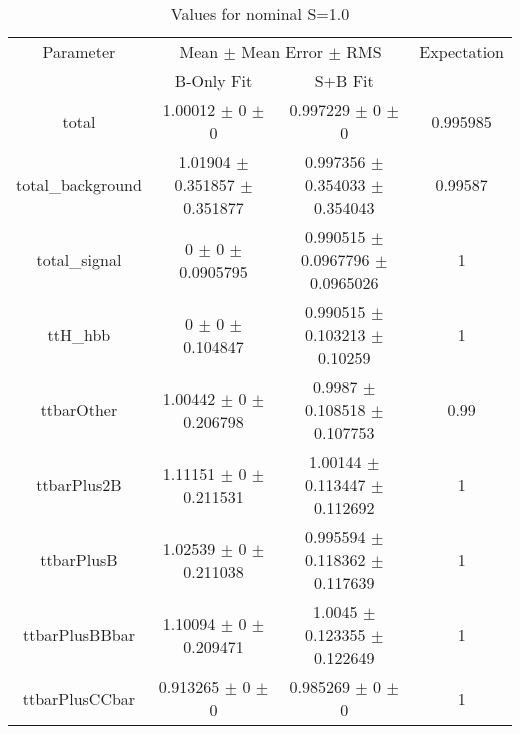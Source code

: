 \begin{table}
\centering
\caption{Values for nominal S=1.0}
\begin{tabular}{cccc}
\toprule
Parameter & \multicolumn{2}{c}{Mean $\pm$ Mean Error $\pm$ RMS} & Expectation\\
 & B-Only Fit & S+B Fit & \\
\midrule
total & \num{1.00012} $\pm$ \num{0} $\pm$ \num{0} & \num{0.997229} $\pm$ \num{0} $\pm$ \num{0} & \num{0.995985}\\
total\_background & \num{1.01904} $\pm$ \num{0.351857} $\pm$ \num{0.351877} & \num{0.997356} $\pm$ \num{0.354033} $\pm$ \num{0.354043} & \num{0.99587}\\
total\_signal & \num{0} $\pm$ \num{0} $\pm$ \num{0.0905795} & \num{0.990515} $\pm$ \num{0.0967796} $\pm$ \num{0.0965026} & \num{1}\\
ttH\_hbb & \num{0} $\pm$ \num{0} $\pm$ \num{0.104847} & \num{0.990515} $\pm$ \num{0.103213} $\pm$ \num{0.10259} & \num{1}\\
ttbarOther & \num{1.00442} $\pm$ \num{0} $\pm$ \num{0.206798} & \num{0.9987} $\pm$ \num{0.108518} $\pm$ \num{0.107753} & \num{0.99}\\
ttbarPlus2B & \num{1.11151} $\pm$ \num{0} $\pm$ \num{0.211531} & \num{1.00144} $\pm$ \num{0.113447} $\pm$ \num{0.112692} & \num{1}\\
ttbarPlusB & \num{1.02539} $\pm$ \num{0} $\pm$ \num{0.211038} & \num{0.995594} $\pm$ \num{0.118362} $\pm$ \num{0.117639} & \num{1}\\
ttbarPlusBBbar & \num{1.10094} $\pm$ \num{0} $\pm$ \num{0.209471} & \num{1.0045} $\pm$ \num{0.123355} $\pm$ \num{0.122649} & \num{1}\\
ttbarPlusCCbar & \num{0.913265} $\pm$ \num{0} $\pm$ \num{0} & \num{0.985269} $\pm$ \num{0} $\pm$ \num{0} & \num{1}\\
\bottomrule
\end{tabular}
\end{table}